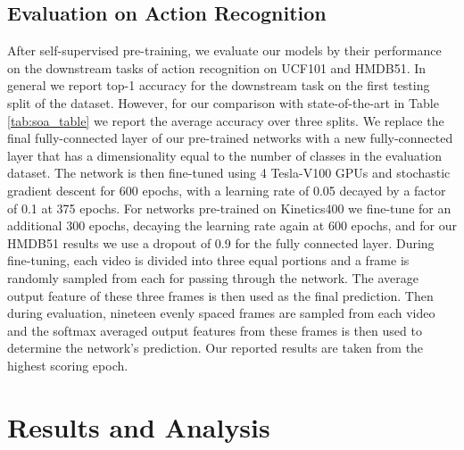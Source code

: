 \documentclass[a4paper,conference]{IEEEtran}
\begin{document}
\subsection{Evaluation on Action Recognition}
After self-supervised pre-training, we evaluate our models by their performance on the downstream tasks of action recognition on UCF101 and HMDB51. In general we report top-1 accuracy for the downstream task on the first testing split of the dataset. However, for our comparison with state-of-the-art in Table \ref{tab:soa_table} we report the average accuracy over three splits. We replace the final fully-connected layer of our pre-trained networks with a new fully-connected layer that has a dimensionality equal to the number of classes in the evaluation dataset. The network is then fine-tuned using 4 Tesla-V100 GPUs and stochastic gradient descent for 600 epochs, with a learning rate of 0.05 decayed by a factor of 0.1 at 375 epochs. For networks pre-trained on Kinetics400 we fine-tune for an additional 300 epochs, decaying the learning rate again at 600 epochs, and for our HMDB51 results we use a dropout of 0.9 for the fully connected layer. During fine-tuning, each video is divided into three equal portions and a frame is randomly sampled from each for passing through the network. The average output feature of these three frames is then used as the final prediction. Then during evaluation, nineteen evenly spaced frames are sampled from each video and the softmax averaged output features from these frames is then used to determine the network's prediction. Our reported results are taken from the highest scoring epoch.
    








\section{Results and Analysis} 
\label{sec:ResultsAnalysis}
\end{document}
